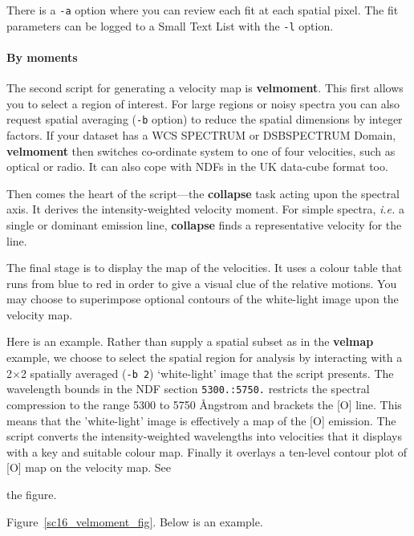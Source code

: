 \documentclass[twoside,11pt]{article}
\newcommand{\htmlref}[2]{#1}
\newcommand{\latex}[1]{#1}
\newcommand{\xref}[3]{#1}
\newcommand{\xlabel}[1]{}
\begin{document}
{There is a {\tt -a} option where you can review each fit at each
spatial pixel.   The fit parameters can be logged to a 
\xref{Small Text List}{sun190}{} with the {\tt -l} option.

\paragraph{\label{sc16_velmoment}\latex{\vspace*{0.8em}}By
moments\latex{\newline}\xlabel{sc16_velmoment}}

\hspace*{-2.1ex}The second script for generating a velocity map is \xref{{\bf
velmoment}}{sun237}{velmoment}.  This first allows you to select a
region of interest.  For large regions or noisy spectra you can also
request spatial averaging ({\tt -b} option) to reduce the spatial
dimensions by integer factors.  If your dataset has a WCS
\xref{SPECTRUM or DSBSPECTRUM Domain}{sun95}{se_domains}, {\bf velmoment}
then switches co-ordinate system to one of four velocities, such as
optical or radio.  It can also cope with NDFs in the
\htmlref{UK data-cube format}{sc16_teifufile} too.

Then comes the heart of the script---the 
\xref{{\bf collapse}}{sun95}{COLLAPSE} task acting upon the spectral
axis.  It derives the intensity-weighted velocity moment.  For simple
spectra, \emph{i.e.} a single or dominant emission line, {\bf
collapse} finds a representative velocity for the line.

The final stage is to display the map of the velocities.  It uses a
colour table that runs from blue to red in order to give a visual clue
of the relative motions.  You may choose to superimpose optional
contours of the white-light image upon the velocity map.

Here is an example.  Rather than supply a spatial subset as in the
{\bf velmap} example, we choose to select the spatial region for
analysis by interacting with a 2$\times$2 spatially averaged ({\tt -b
2}) `white-light' image that the script presents.  The wavelength
bounds in the NDF section {\tt 5300.:5750.} restricts the spectral
compression to the range 5300 to 5750 {\AA}ngstrom and brackets the
[O{}] line.  This means that the 'white-light' image is
effectively a map of the [O{}] emission.  The script converts the
intensity-weighted wavelengths into velocities that it displays with a
key and suitable colour map.  Finally it overlays a ten-level contour
plot of [O{}] map on the velocity map.  See
\begin{htmlonly}
the figure.
\end{htmlonly}
\latex{Figure~\ref{sc16_velmoment_fig}.}  Below is an
example.

}
\end{document}
